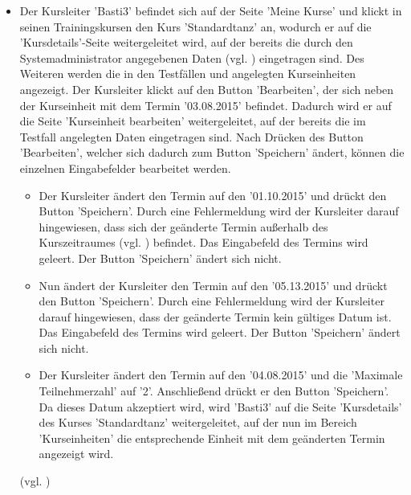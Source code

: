 \documentclass[a4paper]{scrreprt}
\begin{document}
\begin{itemize}
			\item {}
			Der Kursleiter 'Basti3' befindet sich auf der Seite 'Meine Kurse' und klickt in seinen Trainingskursen den Kurs 'Standardtanz' an, wodurch er auf die 'Kursdetails'-Seite weitergeleitet wird, auf der bereits die durch den Systemadministrator angegebenen Daten (vgl. ) eingetragen sind. Des Weiteren werden die in den Testfällen  und  angelegten Kurseinheiten angezeigt. Der Kursleiter klickt auf den Button 'Bearbeiten', der sich neben der Kurseinheit mit dem Termin '03.08.2015' befindet. Dadurch wird er auf die Seite 'Kurseinheit bearbeiten' weitergeleitet, auf der bereits die im Testfall  angelegten Daten eingetragen sind. Nach Drücken des Button 'Bearbeiten', welcher sich dadurch zum Button 'Speichern' ändert, können die einzelnen Eingabefelder bearbeitet werden. 
			\begin{itemize}
				\item Der Kursleiter ändert den Termin auf den '01.10.2015' und drückt den Button 'Speichern'. Durch eine Fehlermeldung wird der Kursleiter darauf hingewiesen, dass sich der geänderte Termin außerhalb des Kurszeitraumes (vgl. ) befindet. Das Eingabefeld des Termins wird geleert. Der Button 'Speichern' ändert sich nicht.
				
				\item Nun ändert der Kursleiter den Termin auf den '05.13.2015' und drückt den Button 'Speichern'. Durch eine Fehlermeldung wird der Kursleiter darauf hingewiesen, dass der geänderte Termin kein gültiges Datum ist. Das Eingabefeld des Termins wird geleert. Der Button 'Speichern' ändert sich nicht.
				
				\item Der Kursleiter ändert den Termin auf den '04.08.2015' und die 'Maximale Teilnehmerzahl' auf '2'. Anschließend drückt er den Button 'Speichern'. Da dieses Datum akzeptiert wird, wird 'Basti3' auf die Seite 'Kursdetails' des Kurses 'Standardtanz' weitergeleitet, auf der nun im Bereich 'Kurseinheiten' die entsprechende Einheit mit dem geänderten Termin angezeigt wird.
			\end{itemize}
			(vgl. )
			

\end{itemize}
\end{document}
